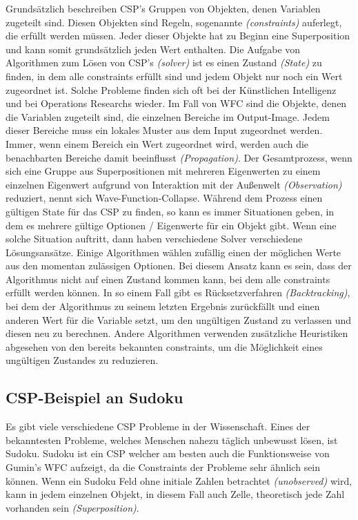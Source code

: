 \documentclass[12pt, a4paper,twoside,openright]{report} %
\begin{document}
Grundsätzlich beschreiben CSP's Gruppen von Objekten, denen Variablen zugeteilt sind.
Diesen Objekten sind Regeln, sogenannte \textit{(constraints)} auferlegt, die erfüllt werden müssen.
Jeder dieser Objekte hat zu Beginn eine Superposition und kann somit grundsätzlich jeden Wert enthalten.
Die Aufgabe von Algorithmen zum Lösen von CSP's \textit{(solver)} ist es einen Zustand \textit{(State)} zu finden,
in dem alle constraints erfüllt sind und jedem Objekt nur noch ein Wert zugeordnet ist. \cite{Lecoutre2009ConstraintNT}
Solche Probleme finden sich oft bei der Künstlichen Intelligenz und bei Operations Researchs wieder.
Im Fall von WFC sind die Objekte, denen die Variablen zugeteilt sind, die einzelnen Bereiche im Output-Image.
Jedem dieser Bereiche muss ein lokales Muster aus dem Input zugeordnet werden.
Immer, wenn einem Bereich ein Wert zugeordnet wird, werden auch die benachbarten Bereiche damit beeinflusst \textit{(Propagation)}.
Der Gesamtprozess, wenn sich eine Gruppe aus Superpositionen mit mehreren Eigenwerten zu einem einzelnen Eigenwert aufgrund von Interaktion mit der Außenwelt \textit{(Observation)} reduziert,
nennt sich Wave-Function-Collapse. \cite{Zinkernagel_2016}
Während dem Prozess einen gültigen State für das CSP zu finden, so kann es immer Situationen geben, in dem es mehrere gültige Optionen / Eigenwerte für ein Objekt gibt.
Wenn eine solche Situation auftritt, dann haben verschiedene Solver verschiedene Lösungsansätze.
Einige Algorithmen wählen zufällig einen der möglichen Werte aus den momentan zulässigen Optionen.
Bei diesem Ansatz kann es sein, dass der Algorithmus nicht auf einen Zustand kommen kann, bei dem alle constraints erfüllt werden können.
In so einem Fall gibt es Rücksetzverfahren \textit{(Backtracking)}, bei dem der Algorithmus zu seinem letzten Ergebnis zurückfällt und einen anderen Wert für die Variable setzt,
um den ungültigen Zustand zu verlassen und diesen neu zu berechnen.
Andere Algorithmen verwenden zusätzliche Heuristiken abgesehen von den bereits bekannten constraints, um die Möglichkeit eines ungültigen Zustandes zu reduzieren. \cite{Karth2017WaveFunctionCollapseIC}
\pagebreak

\subsection{CSP-Beispiel an Sudoku}
Es gibt viele verschiedene CSP Probleme in der Wissenschaft.
Eines der bekanntesten Probleme, welches Menschen nahezu täglich unbewusst lösen, ist Sudoku.
Sudoku ist ein CSP welcher am besten auch die Funktionsweise von Gumin's WFC aufzeigt, da die Constraints der Probleme sehr ähnlich sein können.
Wenn ein Sudoku Feld ohne initiale Zahlen betrachtet \textit{(unobserved)} wird, kann in jedem einzelnen Objekt, in diesem Fall auch Zelle, theoretisch jede Zahl vorhanden sein \textit{(Superposition)}.
\end{document}
